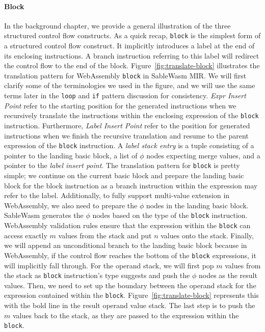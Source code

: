 \paragraph{Block}
In the background chapter, we provide a general illustration of the three
structured control flow constructs. As a quick recap, \texttt{block} is the
simplest form of a structured control flow construct. It implicitly introduces
a label at the end of its enclosing instructions. A branch instruction
referring to this label will redirect the control flow to the end of the block.
Figure~\ref{fig:translate-block} illustrates the translation pattern for
WebAssembly \texttt{block} in SableWasm MIR. We will first clarify some of the
terminologies we used in the figure, and we will use the same terms later in
the \texttt{loop} and \texttt{if} pattern discussion for consistency.
\emph{Expr Insert Point} refer to the starting position for the generated
instructions when we recursively translate the instructions within the enclosing
expression of the \texttt{block} instruction. Furthermore,
\emph{Label Insert Point} refer to the position for generated instructions when
we finish the recursive translation and resume to the parent expression of the
\texttt{block} instruction. A \emph{label stack entry} is a tuple consisting of
a pointer to the landing basic block, a list of $\phi$ nodes expecting merge
values, and a pointer to the \emph{label insert point}. The translation pattern
for \texttt{block} is pretty simple; we continue on the current basic block and
prepare the landing basic block for the block instruction as a branch
instruction within the expression may refer to the label. Additionally, to fully
support multi-value extension in WebAssembly, we also need to prepare the $\phi$
nodes in the landing basic block. SableWasm generates the $\phi$ nodes based on
the type of the \texttt{block} instruction. WebAssembly validation rules ensure
that the expression within the \texttt{block} can access exactly $m$ values from
the stack and put $n$ values onto the stack. Finally, we will append an
unconditional branch to the landing basic block because in WebAssembly,
if the control flow reaches the bottom of the \texttt{block} expressions, it
will implicitly fall through. For the operand stack, we will first pop $m$
values from the stack as \texttt{block} instruction's type suggests and push the
$\phi$ nodes as the result values. Then, we need to set up the boundary between
the operand stack for the expression contained within the \texttt{block}.
Figure~\ref{fig:translate-block} represents this with the bold line in the
result operand value stack. The last step is to push the $m$ values back to the
stack, as they are passed to the expression within the \texttt{block}.

